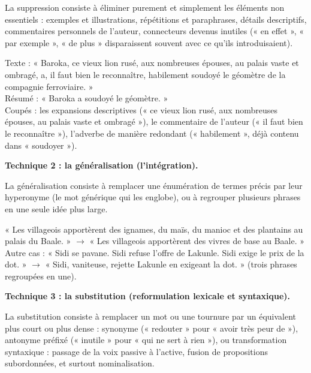 \documentclass[11pt]{article}
\newcommand{\cle}[1]{{\popxbold\color{popdark}#1}}
\begin{document}
\begin{definition}[Suppression]
La \cle{suppression} consiste à éliminer purement et simplement les éléments non essentiels : exemples et illustrations, répétitions et paraphrases, détails descriptifs, commentaires personnels de l'auteur, connecteurs devenus inutiles (« en effet », « par exemple », « de plus » disparaissent souvent avec ce qu'ils introduisaient).
\end{definition}

\begin{exemplebox}
Texte : « Baroka, ce vieux lion rusé, aux nombreuses épouses, au palais vaste et ombragé, a, il faut bien le reconnaître, habilement soudoyé le géomètre de la compagnie ferroviaire. »\\
Résumé : « Baroka a soudoyé le géomètre. »\\
Coupés : les expansions descriptives (« ce vieux lion rusé, aux nombreuses épouses, au palais vaste et ombragé »), le commentaire de l'auteur (« il faut bien le reconnaître »), l'adverbe de manière redondant (« habilement », déjà contenu dans « soudoyer »).
\end{exemplebox}

\textbf{Technique 2 : la généralisation (l'intégration).}

\begin{definition}[Généralisation]
La \cle{généralisation} consiste à remplacer une énumération de termes précis par leur \cle{hyperonyme} (le mot générique qui les englobe), ou à regrouper plusieurs phrases en une seule idée plus large.
\end{definition}

\begin{exemplebox}
« Les villageois apportèrent des ignames, du maïs, du manioc et des plantains au palais du Baale. » $\rightarrow$ « Les villageois apportèrent des vivres de base au Baale. »\\
Autre cas : « Sidi se pavane. Sidi refuse l'offre de Lakunle. Sidi exige le prix de la dot. » $\rightarrow$ « Sidi, vaniteuse, rejette Lakunle en exigeant la dot. » (trois phrases regroupées en une).
\end{exemplebox}

\textbf{Technique 3 : la substitution (reformulation lexicale et syntaxique).}

\begin{definition}[Substitution]
La \cle{substitution} consiste à remplacer un mot ou une tournure par un équivalent plus court ou plus dense : synonyme (« redouter » pour « avoir très peur de »), antonyme préfixé (« inutile » pour « qui ne sert à rien »), ou transformation syntaxique : passage de la voix passive à l'active, fusion de propositions subordonnées, et surtout \cle{nominalisation}.
\end{definition}
\end{document}

